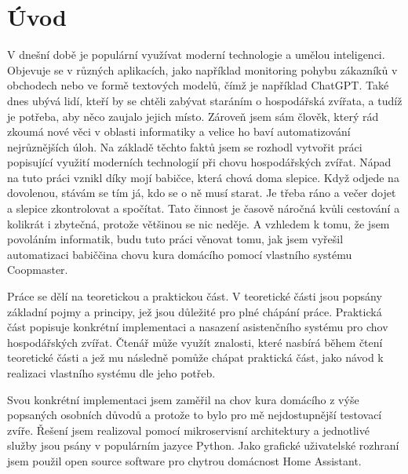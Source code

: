 \chapter{Úvod}\label{ch:uvod}

V dnešní době je populární využívat moderní technologie a umělou inteligenci.
Objevuje se v různých aplikacích, jako například monitoring pohybu zákazníků v obchodech nebo ve formě textových modelů, čímž je například ChatGPT.
Také dnes ubývá lidí, kteří by se chtěli zabývat staráním o hospodářská zvířata, a tudíž je potřeba, aby něco zaujalo jejich místo.
Zároveň jsem sám člověk, který rád zkoumá nové věci v oblasti informatiky a velice ho baví automatizování nejrůznějších úloh.
Na základě těchto faktů jsem se rozhodl vytvořit práci popisující využití moderních technologií při chovu hospodářských zvířat.
Nápad na tuto práci vznikl díky mojí babičce, která chová doma slepice.
Když odjede na dovolenou, stávám se tím já, kdo se o ně musí starat.
Je třeba ráno a večer dojet a slepice zkontrolovat a spočítat.
Tato činnost je časově náročná kvůli cestování a kolikrát i zbytečná, protože většinou se nic neděje.
A vzhledem k tomu, že jsem povoláním informatik, budu tuto práci věnovat tomu, jak jsem vyřešil automatizaci babiččina chovu kura domácího pomocí vlastního systému Coopmaster.

\newline
Práce se dělí na teoretickou a praktickou část.
V teoretické části jsou popsány základní pojmy a principy, jež jsou důležité pro plné chápání práce.
Praktická část popisuje konkrétní implementaci a nasazení asistenčního systému pro chov hospodářských zvířat.
Čtenář může využít znalosti, které nasbírá během čtení teoretické části a jež mu následně pomůže chápat praktická část, jako návod k realizaci vlastního systému dle jeho potřeb.
\newline

Svou konkrétní implementaci jsem zaměřil na chov kura domácího z výše popsaných osobních důvodů a protože to bylo pro mě nejdostupnější testovací zvíře.
Řešení jsem realizoval pomocí mikroservisní architektury a jednotlivé služby jsou psány v populárním jazyce Python.
Jako grafické uživatelské rozhraní jsem použil open source software pro chytrou domácnost Home Assistant.
